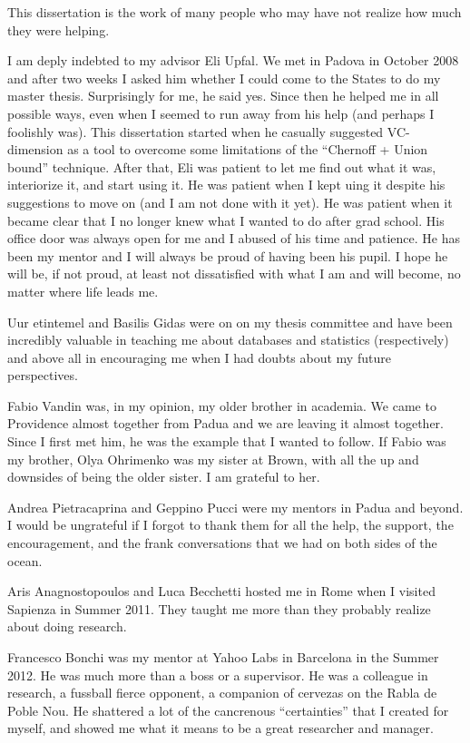 \iffalse
This dissertation is the work of many people who may have not realize how much
they were helping.

I am deply indebted to my advisor Eli Upfal. We met in Padova in October 2008
and after two weeks I asked him whether I could come to the States to do my
master thesis. Surprisingly for me, he said yes. Since then he helped me in all
possible ways, even when I seemed to run away from his help (and perhaps I
foolishly was). This dissertation started when he casually suggested
VC-dimension as a tool to overcome some limitations of the ``Chernoff + Union
bound'' technique. After that, Eli was patient to let me find out what it was,
interiorize it, and start using it. He was patient when I kept uing it despite
his suggestions to move on (and I am not done with it yet). He was patient when
it became clear that I no longer knew what I wanted to do after grad school. His
office door was always open for me and I abused of his time and patience. He has
been my mentor and I will always be proud of having been his pupil. I hope he
will be, if not proud, at least not dissatisfied with what I am and will become,
no matter where life leads me.  

U\vg ur \cC etintemel and Basilis Gidas were on on my thesis committee and have
been incredibly valuable in teaching me about databases and statistics
(respectively) and above all in encouraging me when I had doubts about my future
perspectives.

Fabio Vandin was, in my opinion, my older brother in academia. We came to
Providence almost together from Padua and we are leaving it almost together.
Since I first met him, he was the example that I wanted to follow. If Fabio was
my brother, Olya Ohrimenko was my sister at Brown, with all the up and downsides
of being the older sister. I am grateful to her.

Andrea Pietracaprina and Geppino Pucci were my mentors in Padua and beyond. I
would be ungrateful if I forgot to thank them for all the help, the support, the
encouragement, and the frank conversations that we had on both sides of the
ocean.

Aris Anagnostopoulos and Luca Becchetti hosted me in Rome when I visited
Sapienza in Summer 2011. They taught me more than they probably realize about
doing research. 

Francesco Bonchi was my mentor at Yahoo Labs in Barcelona in the Summer 2012. He
was much more than a boss or a supervisor. He was a colleague in research, a
fussball fierce opponent, a companion of cervezas on the Rabla de Poble Nou.
He shattered a lot of the cancrenous ``certainties'' that I created for myself,
and showed me what it means to be a great researcher and manager.

